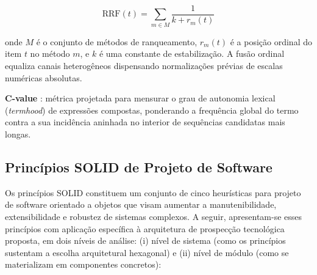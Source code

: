 \documentclass[12pt, a4paper]{article}
\begin{document}
$$\text{RRF}(t) = \sum_{m \in M} \frac{1}{k + r_m(t)}$$

  onde $M$ é o conjunto de métodos de ranqueamento, $r_m(t)$ é a posição ordinal do item $t$ no método $m$, e $k$ é uma constante de estabilização. A fusão ordinal equaliza canais heterogêneos dispensando normalizações prévias de escalas numéricas absolutas.

  \textbf{C-value} \cite{frantzi2000}: métrica projetada para mensurar o grau de autonomia lexical (\textit{termhood}) de expressões compostas, ponderando a frequência global do termo contra a sua incidência aninhada no interior de sequências candidatas mais longas.

  \subsection{Princípios SOLID de Projeto de Software}
  \label{sec:solid}

  Os princípios SOLID \cite{martin2002, martin2017} constituem um conjunto de cinco heurísticas para projeto de software orientado a objetos que visam aumentar a manutenibilidade, extensibilidade e robustez de sistemas complexos. A seguir, apresentam-se esses princípios com aplicação específica à arquitetura de prospecção tecnológica proposta, em dois níveis de análise: (i) nível de sistema (como os princípios sustentam a escolha arquitetural hexagonal) e (ii) nível de módulo (como se materializam em componentes concretos):
\end{document}
